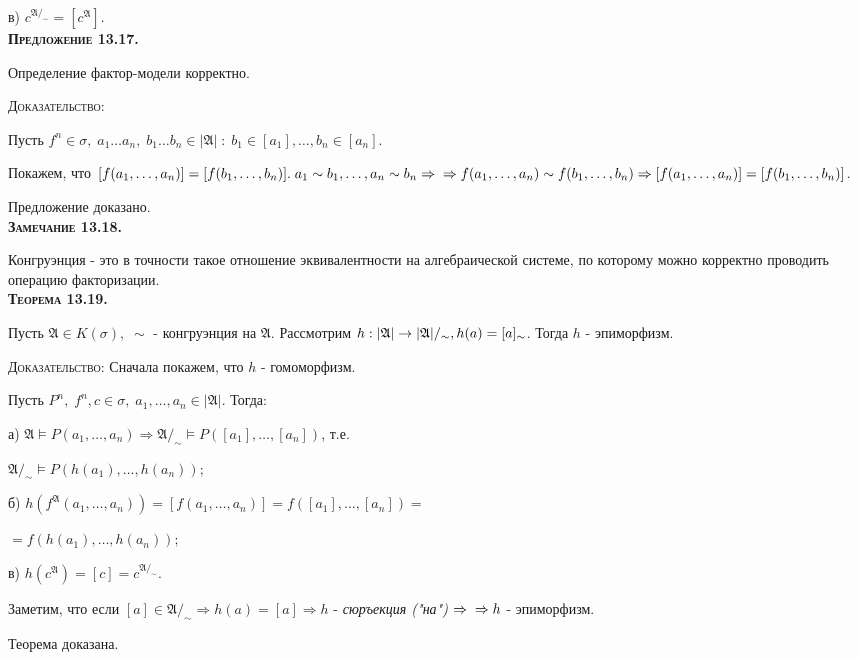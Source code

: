 \documentclass[18pt, a4paper]{extarticle}
\newcommand{\mA}{\mathfrak{A}}
\begin{document}
в) $c^{\mA/_\sim}=[c^\mA]$.\\

\textbf{\textsc{Предложение 13.17.}} 

Определение фактор-модели корректно.

\textsc{Доказательство: }

Пусть $f^n\in\sigma,\;a_1\dots a_n,\;b_1\dots b_n\in|\mathfrak{A}|\;:\;b_1\in[a_1],\dots,b_n\in[a_n]$.

Покажем, что $[f(a_1,\dots,a_n)]=[f(b_1,\dots,b_n)].\; a_1\sim b_1,\dots,a_n\sim b_n\Rightarrow\newline\Rightarrow f(a_1,\dots,a_n)\sim f(b_1,\dots,b_n)\Rightarrow [f(a_1,\dots,a_n)]=[f(b_1,\dots,b_n)]$.

Предложение доказано.\\

\textbf{\textsc{Замечание 13.18.}} 

Конгруэнция - это в точности такое отношение эквивалентности на алгебраической системе, по которому можно корректно проводить операцию факторизации.\\

\textbf{\textsc{Теорема 13.19.}} 

Пусть $\mathfrak{A}\in K(\sigma),\;\sim$ -  конгруэнция на $\mathfrak{A}$. Рассмотрим $h:|\mathfrak{A}|\to|\mathfrak{A}|/_\sim,\\ h(a)=[a]_\sim$. Тогда $h$ -  эпиморфизм.

\textsc{Доказательство:} Сначала покажем, что $h$ -  гомоморфизм.

Пусть $P^n,\;f^n,c\in\sigma,\;a_1,\dots, a_n\in|\mathfrak{A}|$. Тогда:

а) $\mathfrak{A}\vDash P(a_1,\dots,a_n)\Rightarrow\mathfrak{A}/_\sim\vDash P([a_1],\dots,[a_n])$, т.е. 

\qquad$\mathfrak{A}/_\sim\vDash P(h(a_1),\dots,h(a_n));$

б) $h(f^{\mathfrak{A}}(a_1,\dots,a_n))=[f(a_1,\dots,a_n)]=f([a_1],\dots,[a_n])=$

\qquad $= f(h(a_1),\dots,h(a_n));$

в) $h(c^{\mathfrak{A}})=[c]=c^{\mathfrak{A}/_\sim}$.

Заметим, что если $[a]\in\mathfrak{A}/_\sim\Rightarrow h(a)=[a]\Rightarrow h$ -  \textit{сюръекция ("на")} $\Rightarrow \newline \Rightarrow h$ -  эпиморфизм.

Теорема доказана.\\
\end{document}
